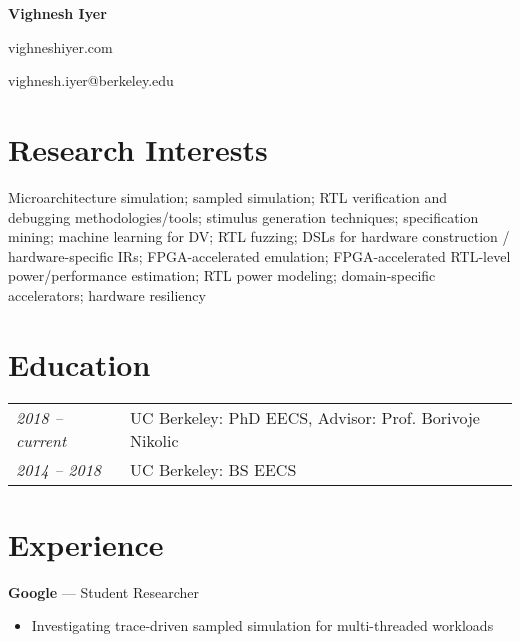 \documentclass[10pt]{article}
\begin{document}
\begin{center}
    {\LARGE \textbf{Vighnesh Iyer}}

    {\small vighneshiyer.com}

    {\small vighnesh.iyer@berkeley.edu}
\end{center}

\section{Research Interests}
\vspace{-0.1cm}
{Microarchitecture simulation; sampled simulation; RTL verification and debugging methodologies/tools; stimulus generation techniques; specification mining; machine learning for DV; RTL fuzzing; DSLs for hardware construction / hardware-specific IRs; FPGA-accelerated emulation; FPGA-accelerated RTL-level power/performance estimation; RTL power modeling; domain-specific accelerators; hardware resiliency}
\vspace{-0.2cm}

\section{Education}
\vspace{-0.1cm}
\begin{tabular}{@{}ll}
    \textit{2018 -- current} & UC Berkeley: PhD EECS, Advisor: Prof. Borivoje Nikolic\\
    \textit{2014 -- 2018} & UC Berkeley: BS EECS
\end{tabular}
\vspace{-0.2cm}

\section{Experience}

 \textbf{Google} --- Student Researcher
\begin{itemize}
    \item Investigating trace-driven sampled simulation for multi-threaded workloads
\end{itemize}
\vspace{0.2cm}
\end{document}
